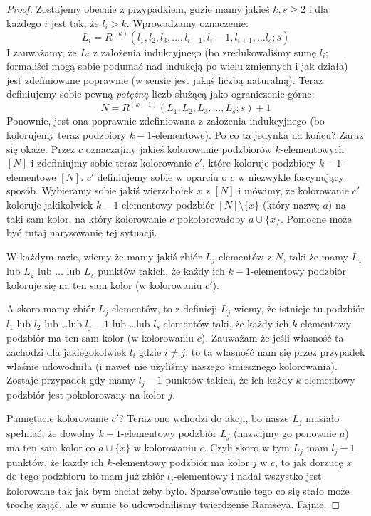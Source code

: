 \begin{proof}
        Zostajemy obecnie z przypadkiem, gdzie mamy jakieś $k, s \geq 2$ i dla każdego $i$ jest tak, że $l_i > k$. Wprowadzamy oznaczenie:
        \begin{equation*}
            L_i = R^{(k)}(l_1,l_2,l_3,\dots, l_{i-1}, l_i - 1, l_{i+1}, \dots l_s;s)
        \end{equation*}
        I zauważamy, że $L_i$ z założenia indukcyjnego (bo zredukowaliśmy sumę $l_i$; formaliści mogą sobie podumać nad indukcją po wielu zmiennych i jak działa) jest zdefiniowane poprawnie (w sensie jest jakąś liczbą naturalną). Teraz definiujemy sobie pewną \textit{potężną} liczb służącą jako ograniczenie górne:
        \begin{equation*}
            N = R^{(k-1)}(L_1, L_2, L_3, \dots, L_s; s) + 1
        \end{equation*}
        Ponownie, jest ona poprawnie zdefiniowana z założenia indukcyjnego (bo kolorujemy teraz podzbiory $k-1$-elementowe). Po co ta jedynka na końcu? Zaraz się okaże. Przez $c$ oznaczajmy jakieś kolorowanie podzbiorów $k$-elementowych $[N]$ i zdefiniujmy sobie teraz kolorowanie $c'$, które koloruje podzbiory $k-1$-elementowe $[N]$. $c'$ definiujemy sobie w oparciu o $c$ w niezwykle fascynujący sposób. Wybieramy sobie jakiś wierzchołek $x$ z $[N]$ i mówimy, że kolorowanie $c'$ koloruje jakikolwiek $k-1$-elementowy podzbiór $[N] \setminus \{x\}$ (który nazwę $a$) na taki sam kolor, na który kolorowanie $c$ pokolorowałoby $a \cup \{x\}$. Pomocne może być tutaj narysowanie tej sytuacji.

        W każdym razie, wiemy że mamy jakiś zbiór $L_j$ elementów z $N$, taki że mamy $L_1$ lub $L_2$ lub $\dots$ lub $L_s$ punktów takich, że każdy ich $k-1$-elementowy podzbiór koloruje się na ten sam kolor (w kolorowaniu $c'$).
        
        A skoro mamy zbiór $L_j$ elementów, to z definicji $L_j$ wiemy, że istnieje tu podzbiór $l_1$ lub $l_2$ lub \dots lub $l_j - 1$ lub \dots lub $l_s$ elementów taki, że każdy ich $k$-elementowy podzbiór ma ten sam kolor (w kolorowaniu $c$). Zauważam że jeśli własność ta zachodzi dla jakiegokolwiek $l_i$ gdzie $i \not = j$, to ta własność nam się przez przypadek właśnie udowodniła (i nawet nie użyliśmy naszego śmiesznego kolorowania). Zostaje przypadek gdy mamy $l_j - 1$ punktów takich, że ich każdy $k$-elementowy podzbiór jest pokolorowany na kolor $j$.

        Pamiętacie kolorowanie $c'$? Teraz ono wchodzi do akcji, bo nasze $L_j$ musiało spełniać, że dowolny $k-1$-elementowy podzbiór $L_j$ (nazwijmy go ponownie $a$) ma ten sam kolor co $a \cup \{x\}$ w kolorowaniu $c$. Czyli skoro w tym $L_j$ mam $l_j - 1$ punktów, że każdy ich $k$-elementowy podzbiór ma kolor $j$ w $c$, to jak dorzucę $x$ do tego podzbioru to mam już zbiór $l_j$-elementowy i nadal wszystko jest kolorowane tak jak bym chciał żeby było. Sparse'owanie tego co się stało może trochę zająć, ale w sumie to udowodniliśmy twierdzenie Ramseya. Fajnie.  
    \end{proof}
  